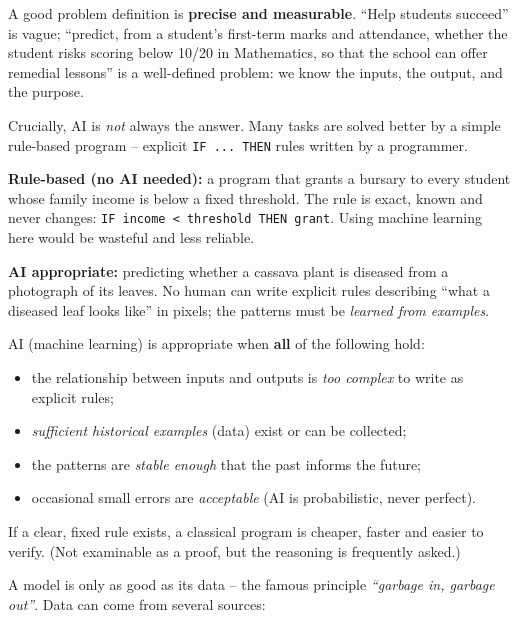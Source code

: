 \documentclass[11pt]{article}
\newcommand{\cle}[1]{{\popxbold\color{popdark}#1}}
\newcounter{popsec}
\newcounter{popsub}
\newcommand{\courssub}[1]{%
  \stepcounter{popsub}%
  \par\vspace{9pt}\noindent{\popxbold\fontsize{11.5}{13}\selectfont\color{popink}{\color{poporange}\thepopsec.\thepopsub}\hspace{6pt}#1}\par\nopagebreak\vspace{4pt}
}
\begin{document}
A good problem definition is \textbf{precise and measurable}. ``Help students succeed'' is vague; ``predict, from a student's first-term marks and attendance, whether the student risks scoring below 10/20 in Mathematics, so that the school can offer remedial lessons'' is a well-defined problem: we know the inputs, the output, and the purpose.

Crucially, AI is \emph{not} always the answer. Many tasks are solved better by a simple \cle{rule-based program} -- explicit \texttt{IF ... THEN} rules written by a programmer.

\begin{exemplebox}
\textbf{Rule-based (no AI needed):} a program that grants a bursary to every student whose family income is below a fixed threshold. The rule is exact, known and never changes: \texttt{IF income < threshold THEN grant}. Using machine learning here would be wasteful and less reliable.

\textbf{AI appropriate:} predicting whether a cassava plant is diseased from a photograph of its leaves. No human can write explicit rules describing ``what a diseased leaf looks like'' in pixels; the patterns must be \emph{learned from examples}.
\end{exemplebox}

\begin{propriete}
AI (machine learning) is appropriate when \textbf{all} of the following hold:
\begin{itemize}
\item the relationship between inputs and outputs is \emph{too complex} to write as explicit rules;
\item \emph{sufficient historical examples} (data) exist or can be collected;
\item the patterns are \emph{stable enough} that the past informs the future;
\item occasional small errors are \emph{acceptable} (AI is probabilistic, never perfect).
\end{itemize}
If a clear, fixed rule exists, a classical program is cheaper, faster and easier to verify. (Not examinable as a proof, but the reasoning is frequently asked.)
\end{propriete}

\courssub{Stage 2: Data Collection}

A model is only as good as its data -- the famous principle \emph{``garbage in, garbage out''}. Data can come from several \cle{sources}:
\end{document}
